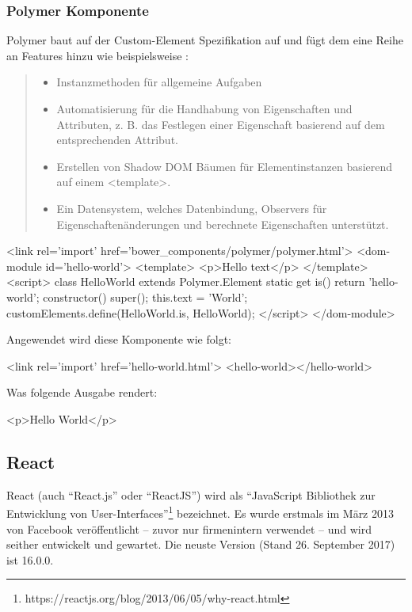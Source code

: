 \subsubsection{Polymer Komponente}
Polymer baut auf der Custom-Element Spezifikation auf und fügt dem eine Reihe an Features hinzu wie beispielsweise \cite{polymer-elements}:
\begin{quote}
	\begin{itemize}
		\item Instanzmethoden für allgemeine Aufgaben
		\item Automatisierung für die Handhabung von Eigenschaften und Attributen, z. B. das Festlegen einer Eigenschaft basierend auf dem entsprechenden Attribut.
		\item Erstellen von Shadow DOM Bäumen für Elementinstanzen basierend auf einem <template>.
		\item Ein Datensystem, welches Datenbindung, Observers für Eigenschaftenänderungen und berechnete Eigenschaften unterstützt.
	\end{itemize}
\end{quote}
\begin{JsCode}
	<link rel='import' href='bower_components/polymer/polymer.html'>
	<dom-module id='hello-world'>
	<template>
	<p>Hello {{text}}</p>
	</template>
	<script>
	class HelloWorld extends Polymer.Element {
		static get is() {
			return 'hello-world';
		}
		constructor() {
			super();
			this.text = 'World';
		}
	}
	customElements.define(HelloWorld.is, HelloWorld);
	</script>
	</dom-module>
\end{JsCode}
Angewendet wird diese Komponente wie folgt:
\begin{JsCode}[numbers=none]
	<link rel='import' href='hello-world.html'>
	<hello-world></hello-world>
\end{JsCode}
Was folgende Ausgabe rendert:
\begin{JsCode}Hello World</p>
\end{JsCode}

\subsection{React}
React (auch "`React.js"' oder "`ReactJS"') wird als "`JavaScript Bibliothek zur Entwicklung von User-Interfaces"'\footnote{https://reactjs.org/blog/2013/06/05/why-react.html} bezeichnet. Es wurde erstmals im März 2013 von Facebook veröffentlicht -- zuvor nur firmenintern verwendet -- und wird seither entwickelt und gewartet. Die neuste Version (Stand 26. September 2017) ist 16.0.0.

